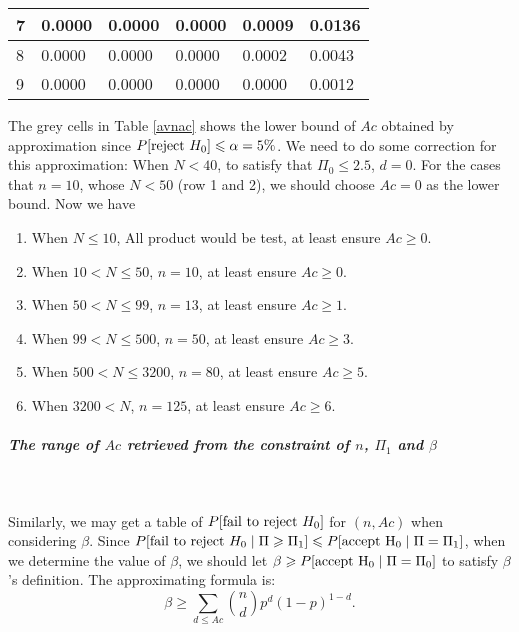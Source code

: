 \documentclass[conf]{new-aiaa}
\begin{document}
\begin{table}[H]
\begin{tabular}{|l|l|l|l|l|l|}
7 & 0.0000                         & 0.0000                         & 0.0000                         & 0.0009                         & 0.0136                         \\ \hline
8 & 0.0000                         & 0.0000                         & 0.0000                         & 0.0002                         & 0.0043                         \\ \hline
9 & 0.0000                         & 0.0000                         & 0.0000                         & 0.0000                         & 0.0012                         \\ \hline
\end{tabular}
\end{table}

The grey cells in Table \ref{avnac} shows the lower bound of $Ac$ obtained by approximation since $P[{\rm reject\ } H_0] \leqslant \alpha = 5\%$. We need to do some correction for this approximation: When $N < 40$, to satisfy that $\Pi_0 \leqslant 2.5$, $d = 0$. For the cases that $n = 10$, whose $N < 50$ (row 1 and 2), we should choose $Ac = 0$ as the lower bound. Now we have \medskip

\begin{enumerate}
    \item When $N \leqslant 10$, All product would be test, at least ensure $Ac \geqslant 0$.
    \item When $10 < N \leqslant 50$, $n = 10$, at least ensure $Ac \geqslant 0$.
    \item When $50 < N \leqslant 99$, $n = 13$, at least ensure $Ac \geqslant 1$.
    \item When $99 < N \leqslant 500$, $n = 50$, at least ensure $Ac \geqslant 3$.
    \item When $500 < N \leqslant 3200$, $n = 80$, at least ensure $Ac \geqslant 5$.
    \item When $3200 < N $, $n = 125$, at least ensure $Ac \geqslant 6$.
\end{enumerate}

\subparagraph{The range of $Ac$ retrieved from the constraint of $n$, $\Pi_1$ and $\beta$}\ \medskip

Similarly, we may get a table of $P[{\rm fail\ to\ reject\ }H_0]$ for $(n, Ac)$ when considering $\beta$. Since $P[{\rm fail\ to\ reject\ }H_0 \mid \Pi \geqslant \Pi_1] \leqslant P[{\rm accept\ H_0} \mid \Pi = \Pi_1]$, when we determine the value of $\beta$, we should let $\beta \geqslant P[{\rm accept\ H_0} \mid \Pi = \Pi_0] $ to satisfy $\beta$'s definition. The approximating formula is:
$$
    \beta \geqslant  \sum_{d \leqslant Ac} \binom{n}{d}p^{d}(1-p)^{1-d}.
$$
\end{document}
